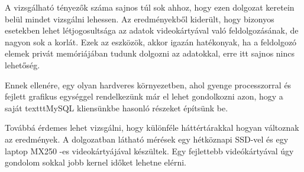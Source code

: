 
A vizsgálható tényezők száma sajnos túl sok ahhoz, hogy ezen dolgozat keretein belül mindet vizsgálni lehessen.
Az eredményekből kiderült, hogy bizonyos esetekben lehet létjogosultsága az adatok videokártyával való feldolgozásának, de nagyon sok a korlát. Ezek az eszközök, akkor igazán hatékonyak, ha a feldolgozó elemek privát memóriájában tudunk dolgozni az adatokkal, erre itt sajnos nincs lehetőség.

Ennek ellenére, egy olyan hardveres környezetben, ahol gyenge processzorral és fejlett grafikus egységgel rendelkezünk már el lehet gondolkozni azon, hogy a saját texttt{MySQL} kliensünkbe hasonló részeket építsünk be.

Továbbá érdemes lehet vizsgálni, hogy különféle háttértárakkal hogyan változnak az eredmények. A dolgozatban látható mérések egy hétköznapi SSD-vel és egy laptop MX250 -es videokártyájával készültek. Egy fejlettebb videókártyával úgy gondolom sokkal jobb kernel időket lehetne elérni. 
